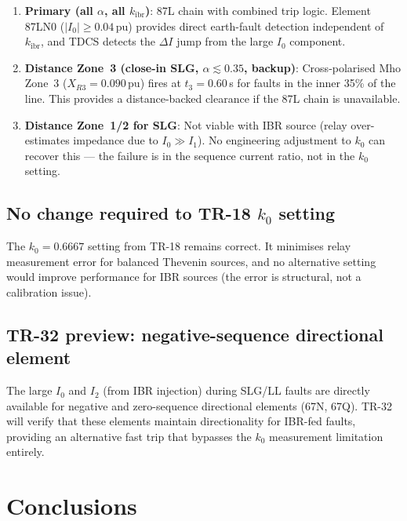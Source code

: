 \documentclass[11pt,a4paper]{article}
\begin{document}
\begin{enumerate}
  \item \textbf{Primary (all $\alpha$, all $k_\mathrm{ibr}$)}: 87L chain with
        combined trip logic.  Element 87LN0 ($|I_0|\geq 0.04$\,pu) provides
        direct earth-fault detection independent of $k_\mathrm{ibr}$, and TDCS
        detects the $\Delta I$ jump from the large $I_0$ component.
  \item \textbf{Distance Zone~3 (close-in SLG, $\alpha\lesssim 0.35$, backup)}:
        Cross-polarised Mho Zone~3 ($X_{R3}=0.090$\,pu) fires at $t_3=0.60$\,s
        for faults in the inner 35\% of the line.  This provides a
        distance-backed clearance if the 87L chain is unavailable.
  \item \textbf{Distance Zone~1/2 for SLG}: Not viable with IBR source (relay
        over-estimates impedance due to $I_0\gg I_1$).  No engineering
        adjustment to $k_0$ can recover this --- the failure is in the
        sequence current ratio, not in the $k_0$ setting.
\end{enumerate}

\subsection{No change required to TR-18 $k_0$ setting}

The $k_0 = 0.6667$ setting from TR-18 remains correct.  It minimises relay
measurement error for balanced Thevenin sources, and no alternative setting
would improve performance for IBR sources (the error is structural, not a
calibration issue).

\subsection{TR-32 preview: negative-sequence directional element}

The large $I_0$ and $I_2$ (from IBR injection) during SLG/LL faults are
directly available for negative and zero-sequence directional elements (67N, 67Q).
TR-32 will verify that these elements maintain directionality for IBR-fed faults,
providing an alternative fast trip that bypasses the $k_0$ measurement
limitation entirely.

\section{Conclusions}
\label{sec:conclusions}
\end{document}
